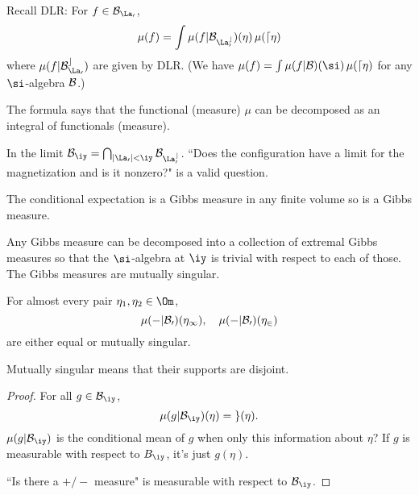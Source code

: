 Recall DLR: For $f\in \cal B_{\La_0}$, 
\[
\mu(f) = \int \mu(f|\cal B_{\La_0^c})(\eta) \,\mu(d\eta)
\]
where $\mu(f|\cal B_{\La_0}^c)$ are given by DLR.
(We have $\mu(f) = \int \mu(f| \cal B)(\si)\,\mu(d\eta)$ for any $\si$-algebra $\cal B$.) %

The formula says that the  functional (measure) $\mu$ can be decomposed as an integral of functionals (measure). %

In the limit $\cal B_\iy = \bigcap_{|\La_0|<\iy} \cal B_{\La_0^c}$. 
``Does the configuration have a limit for the magnetization and is it nonzero?" is a valid question.

The conditional expectation is a Gibbs measure in any finite volume so is a Gibbs measure.

Any Gibbs measure can be decomposed into a collection of extremal Gibbs measures so that the $\si$-algebra at $\iy$ is trivial with respect to each of those. %
The Gibbs measures are mutually singular. 


\begin{clm}
For almost every pair $\eta_1, \eta_2\in \Om$, 
\[
\mu(-|\cal B_0)(\eta_1) ,\quad \mu(-|\cal B_0)(\eta_2) 
\]
are either equal or mutually singular. 
\end{clm}
Mutually singular means that their supports are disjoint. 
\begin{proof}
For all $g\in \cal B_\iy$, 
\[
\mu(g|\cal B_\iy) (\eta) = g(\eta).
\]
$\mu(g|\cal B_\iy)$ is the conditional mean of $g$ when only this information about $\eta$? If $g$ is measurable with respect to $B_\iy$, it's just $g(\eta)$.

``Is there a $+/-$ measure" is measurable with respect to $\cal B_{\iy}$.
\end{proof}

